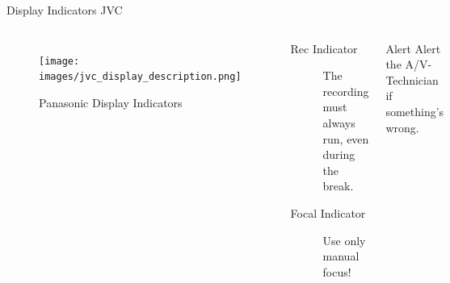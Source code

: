 \documentclass[aspectratio=169]{beamer}
\begin{document}
\begin{frame}{Display Indicators JVC}
	\begin{columns}[T,onlytextwidth]
	\begin{figure} 
		\centering
		\texttt{[image: images/jvc\_display\_description.png]}
		\caption{Panasonic Display Indicators}
	\end{figure}
		\begin{description}
			\item[Rec Indicator] The recording must always run, even during the break.
			\item[Focal Indicator] Use only manual focus!
		\end{description}
		\begin{alertblock}{Alert}
			Alert the A/V-Technician if something's wrong.
		\end{alertblock}
	\end{columns}
\end{frame}


%
\end{document}
